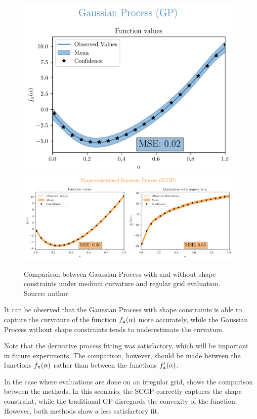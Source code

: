 \begin{figure}[H]
    \centering
    \includegraphics[width=.33\textwidth]{../experiments/uniform_new_MC/GP_20_nobs.png}
    \includegraphics[width=.66\textwidth]{../experiments/uniform_new_MC/SCGP_20_nobs.png}
    \caption{ {\small Comparison between Gaussian Process with and without shape constraints under medium curvature and regular grid evaluation. Source: author.}}
    \label{fig:uniformMC}
\end{figure}

It can be observed that the Gaussian Process with shape constraints is able to capture the curvature of the function \( f_{\boldsymbol{z}}(\alpha) \) more accurately, while the Gaussian Process without shape constraints tends to underestimate the curvature.

\begin{obs}
    Note that the derivative process fitting was satisfactory, which will be important in future experiments. The comparison, however, should be made between the functions \( f_{\boldsymbol{z}}(\alpha) \) rather than between the functions \( f_{\boldsymbol{z}}^\prime(\alpha) \).
\end{obs}

In the case where evaluations are done on an irregular grid,  shows the comparison between the methods. In this scenario, the SCGP correctly captures the shape constraint, while the traditional GP disregards the convexity of the function. However, both methods show a less satisfactory fit.

